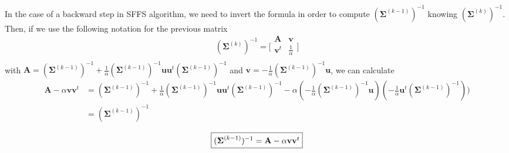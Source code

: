 \documentclass[a4paper,11pt,DIV=16]{scrartcl}
\begin{document}
        In the case of a backward step in SFFS algorithm, we need to invert the formula in order to compute $(\boldsymbol{\Sigma}^{(k-1)})^{-1}$ knowing $(\boldsymbol{\Sigma}^{(k)})^{-1}$. Then, if we use the following notation for the previous matrix
        \begin{equation*}
            (\boldsymbol{\Sigma}^{(k)})^{-1} =
            \bigg[\begin{array}{cc}
            \mathbf{A}   & \mathbf{v} \\
            \mathbf{v}^t & \frac{1}{\alpha} \\
            \end{array}\bigg]
        \end{equation*}
        with $\mathbf{A} = (\boldsymbol{\Sigma}^{(k-1)})^{-1} + \frac{1}{\alpha} (\boldsymbol{\Sigma}^{(k-1)})^{-1} \mathbf{u} \mathbf{u}^t (\boldsymbol{\Sigma}^{(k-1)})^{-1}$ and $\mathbf{v} = - \frac{1}{\alpha} (\boldsymbol{\Sigma}^{(k-1)})^{-1} \mathbf{u}$, we can calculate
        \begin{align*}
            \mathbf{A} - \alpha \mathbf{v} \mathbf{v}^t
            &= (\boldsymbol{\Sigma}^{(k-1)})^{-1} + \frac{1}{\alpha} (\boldsymbol{\Sigma}^{(k-1)})^{-1} \mathbf{u} \mathbf{u}^t (\boldsymbol{\Sigma}^{(k-1)})^{-1} - \alpha (- \frac{1}{\alpha} (\boldsymbol{\Sigma}^{(k-1)})^{-1} \mathbf{u}) (- \frac{1}{\alpha} \mathbf{u}^t (\boldsymbol{\Sigma}^{(k-1)})^{-1})) \\
            &= (\boldsymbol{\Sigma}^{(k-1)})^{-1}
        \end{align*}

        \begin{equation}
            \fbox{$(\boldsymbol{\Sigma}^{(k-1)})^{-1} = \mathbf{A} - \alpha \mathbf{v} \mathbf{v}^t$}
        \end{equation}
\end{document}
